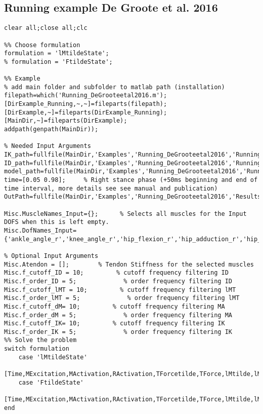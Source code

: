 \documentclass[a4paper,oneside,11pt]{article}
\begin{document}
\subsection{Running example De Groote et al. 2016}
\begin{lstlisting}[frame=none,basicstyle=\tiny]
clear all;close all;clc

%% Choose formulation
formulation = 'lMtildeState';
% formulation = 'FtildeState';

%% Example
% add main folder and subfolder to matlab path (installation)
filepath=which('Running_DeGrooteetal2016.m');
[DirExample_Running,~,~]=fileparts(filepath); [DirExample,~]=fileparts(DirExample_Running);[MainDir,~]=fileparts(DirExample);
addpath(genpath(MainDir));

% Needed Input Arguments
IK_path=fullfile(MainDir,'Examples','Running_DeGrooteetal2016','RunningData','IK_Joggen_1.mot');
ID_path=fullfile(MainDir,'Examples','Running_DeGrooteetal2016','RunningData','ID_Joggen_1.sto');
model_path=fullfile(MainDir,'Examples','Running_DeGrooteetal2016','RunningData','AdDB_Scaled_FB_FA.osim');
time=[0.05 0.98];     % Right stance phase (+50ms beginning and end of time interval, more details see see manual and publication)
OutPath=fullfile(MainDir,'Examples','Running_DeGrooteetal2016','Results');

Misc.MuscleNames_Input={};      % Selects all muscles for the Input DOFS when this is left empty.
Misc.DofNames_Input={'ankle_angle_r','knee_angle_r','hip_flexion_r','hip_adduction_r','hip_rotation_r'};

% Optional Input Arguments
Misc.Atendon = [];        % Tendon Stiffness for the selected muscles
Misc.f_cutoff_ID = 10;         % cutoff frequency filtering ID
Misc.f_order_ID = 5;             % order frequency filtering ID
Misc.f_cutoff_lMT = 10;         % cutoff frequency filtering lMT
Misc.f_order_lMT = 5;             % order frequency filtering lMT
Misc.f_cutoff_dM= 10;         % cutoff frequency filtering MA
Misc.f_order_dM = 5;             % order frequency filtering MA
Misc.f_cutoff_IK= 10;         % cutoff frequency filtering IK
Misc.f_order_IK = 5;             % order frequency filtering IK
%% Solve the problem
switch formulation
    case 'lMtildeState'
        [Time,MExcitation,MActivation,RActivation,TForcetilde,TForce,lMtilde,lM,MuscleNames,OptInfo,DatStore]=SolveMuscleRedundancy_lMtildeState(model_path,IK_path,ID_path,time,OutPath,Misc);
    case 'FtildeState'   
        [Time,MExcitation,MActivation,RActivation,TForcetilde,TForce,lMtilde,lM,MuscleNames,OptInfo,DatStore]=SolveMuscleRedundancy_FtildeState(model_path,IK_path,ID_path,time,OutPath,Misc);
end
\end{lstlisting}
\end{document}
